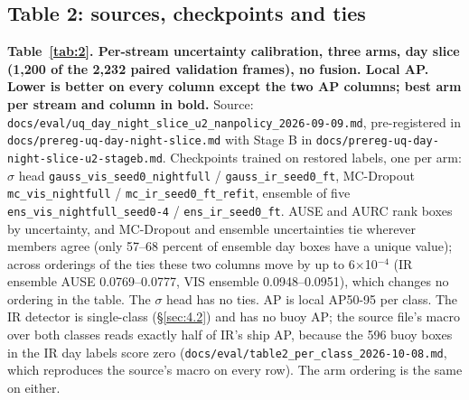 \documentclass[10pt]{article}
\begin{document}
\subsection{Table 2: sources, checkpoints and ties}\label{app:F.1}
\textbf{Table~\ref{tab:2}. Per-stream uncertainty calibration, three arms, day slice (1,200 of the 2,232 paired validation frames), no fusion. Local AP. Lower is better on every column except the two AP columns; best arm per stream and column in bold.} Source: \texttt{docs/\allowbreak{}eval/\allowbreak{}uq\_\allowbreak{}day\_\allowbreak{}night\_\allowbreak{}slice\_\allowbreak{}u2\_\allowbreak{}nanpolicy\_\allowbreak{}2026-09-09.md}, pre-registered in \texttt{docs/\allowbreak{}prereg-uq-day-night-slice.md} with Stage B in \texttt{docs/\allowbreak{}prereg-uq-day-night-slice-u2-stageb.md}. Checkpoints trained on restored labels, one per arm: $\sigma$ head \texttt{gauss\_\allowbreak{}vis\_\allowbreak{}seed0\_\allowbreak{}nightfull} / \texttt{gauss\_\allowbreak{}ir\_\allowbreak{}seed0\_\allowbreak{}ft}, MC-Dropout \texttt{mc\_\allowbreak{}vis\_\allowbreak{}nightfull} / \texttt{mc\_\allowbreak{}ir\_\allowbreak{}seed0\_\allowbreak{}ft\_\allowbreak{}refit}, ensemble of five \texttt{ens\_\allowbreak{}vis\_\allowbreak{}nightfull\_\allowbreak{}seed0-4} / \texttt{ens\_\allowbreak{}ir\_\allowbreak{}seed0\_\allowbreak{}ft}. AUSE and AURC rank boxes by uncertainty, and MC-Dropout and ensemble uncertainties tie wherever members agree (only 57--68 percent of ensemble day boxes have a unique value); across orderings of the ties these two columns move by up to 6$\times$10$^{-4}$ (IR ensemble AUSE 0.0769--0.0777, VIS ensemble 0.0948--0.0951), which changes no ordering in the table. The $\sigma$ head has no ties. AP is local AP50-95 per class. The IR detector is single-class (\S\ref{sec:4.2}) and has no buoy AP; the source file's macro over both classes reads exactly half of IR's ship AP, because the 596 buoy boxes in the IR day labels score zero (\texttt{docs/\allowbreak{}eval/\allowbreak{}table2\_\allowbreak{}per\_\allowbreak{}class\_\allowbreak{}2026-10-08.md}, which reproduces the source's macro on every row). The arm ordering is the same on either.
\end{document}

